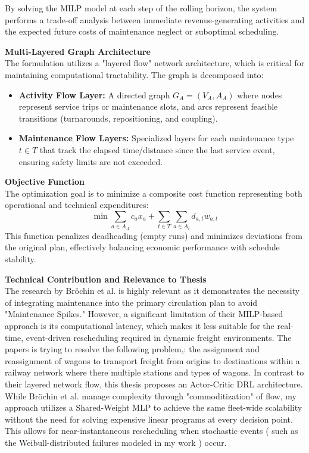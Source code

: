 \documentclass[a4paper]{scrartcl}
\begin{document}
By solving the MILP model at each step of the rolling horizon, the system performs a trade-off analysis between immediate revenue-generating activities and the expected future costs of maintenance neglect or suboptimal scheduling.

\textbf{Multi-Layered Graph Architecture} \\
The formulation utilizes a "layered flow" network architecture, which is critical for maintaining computational tractability. The graph is decomposed into:
\begin{itemize}
    \item \textbf{Activity Flow Layer:} A directed graph $G_A = (V_A, A_A)$ where nodes represent service trips or maintenance slots, and arcs represent feasible transitions (turnarounds, repositioning, and coupling).
    \item \textbf{Maintenance Flow Layers:} Specialized layers for each maintenance type $t \in T$ that track the elapsed time/distance since the last service event, ensuring safety limits are not exceeded.
\end{itemize}

\textbf{Objective Function} \\
The optimization goal is to minimize a composite cost function representing both operational and technical expenditures:
\begin{equation}
    \min \sum_{a \in A_A} c_a x_a + \sum_{t \in T} \sum_{a \in A_t} d_{a,t} w_{a,t}
\end{equation}
This function penalizes deadheading (empty runs) and minimizes deviations from the original plan, effectively balancing economic performance with schedule stability.

\textbf{Technical Contribution and Relevance to Thesis} \\
The research by Bröchin et al. \cite{Bröchin2023} is highly relevant as it demonstrates the necessity of integrating maintenance into the primary circulation plan to avoid "Maintenance Spikes." However, a significant limitation of their MILP-based approach is its computational latency, which makes it less suitable for the real-time, event-driven rescheduling required in dynamic freight environments. 
The papers is trying to resolve the following problem,: the assignment and reassignment of wagons to transport freight from origins to destinations within a railway network where there multiple stations and types of wagons.
In contrast to their layered network flow, this thesis proposes an Actor-Critic DRL architecture. While Bröchin et al. \cite{Bröchin2023} manage complexity through "commoditization" of flow, my approach utilizes a Shared-Weight MLP to achieve the same fleet-wide scalability without the need for solving expensive linear programs at every decision point. This allows for near-instantaneous rescheduling when stochastic events ( such as the Weibull-distributed failures modeled in my work ) occur.
\end{document}
